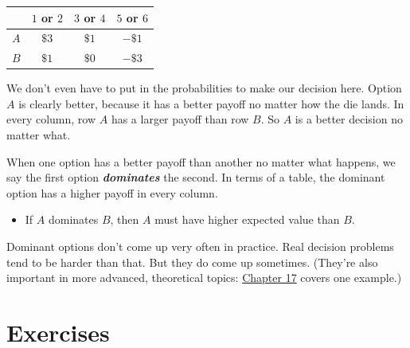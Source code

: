 \documentclass[justified]{tufte-book}
\newenvironment{info}{\begin{itemize}\item[\Info]}{\end{itemize}}
\theoremstyle{definition}
\theoremstyle{definition}
\theoremstyle{definition}
\theoremstyle{remark}
\begin{document}
\begin{longtable}[]{@{}lccc@{}}
\toprule
& \(1\) or \(2\) & \(3\) or \(4\) & \(5\) or \(6\)\tabularnewline
\midrule
\endhead
\(A\) & \(\$3\) & \(\$1\) & \(-\$1\)\tabularnewline
\(B\) & \(\$1\) & \(\$0\) & \(-\$3\)\tabularnewline
\bottomrule
\end{longtable}

We don't even have to put in the probabilities to make our decision
here. Option \(A\) is clearly better, because it has a better payoff no
matter how the die lands. In every column, row \(A\) has a larger payoff
than row \(B\). So \(A\) is a better decision no matter what.

When one option has a better payoff than another no matter what happens,
we say the first option \textbf{\emph{dominates}} the second. In terms
of a table, the dominant option has a higher payoff in every column.

\begin{info}
If \(A\) dominates \(B\), then \(A\) must have higher expected value
than \(B\).
\end{info}

Dominant options don't come up very often in practice. Real decision
problems tend to be harder than that. But they do come up sometimes.
(They're also important in more advanced, theoretical topics:
\protect\hyperlink{dutch-books-1}{Chapter 17} covers one example.)

\hypertarget{exercises-8}{%
\section*{Exercises}\label{exercises-8}}
\end{document}
